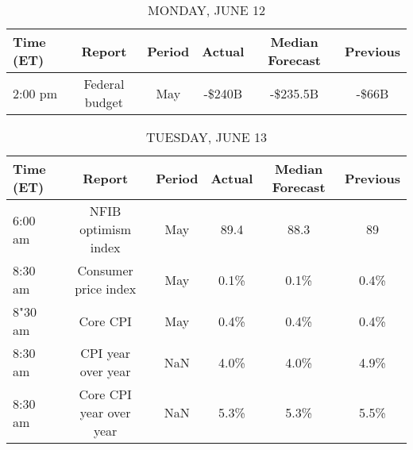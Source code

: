 \documentclass{article}%
\begin{document}
%
\normalsize%


\begin{table}[htbp]%
\caption{MONDAY, JUNE 12}%
\centering%
\begin{adjustbox}{width=1\textwidth}%
\begin{tabular}{lccccc}
\toprule
Time (ET) &         Report & Period & Actual & Median Forecast & Previous \\
\midrule
  2:00 pm & Federal budget &    May & -\$240B &        -\$235.5B &    -\$66B \\
\bottomrule
\end{tabular}
%
\end{adjustbox}%
\end{table}

%


\begin{table}[htbp]%
\caption{TUESDAY, JUNE 13}%
\centering%
\begin{adjustbox}{width=1\textwidth}%
\begin{tabular}{lccccc}
\toprule
Time (ET) &                  Report & Period & Actual & Median Forecast & Previous \\
\midrule
  6:00 am &     NFIB optimism index &    May &   89.4 &            88.3 &       89 \\
  8:30 am &    Consumer price index &    May &   0.1\% &            0.1\% &     0.4\% \\
  8"30 am &                Core CPI &    May &   0.4\% &            0.4\% &     0.4\% \\
  8:30 am &      CPI year over year &    NaN &   4.0\% &            4.0\% &     4.9\% \\
  8:30 am & Core CPI year over year &    NaN &   5.3\% &            5.3\% &     5.5\% \\
\bottomrule
\end{tabular}
%
\end{adjustbox}%
\end{table}

%
\end{document}
